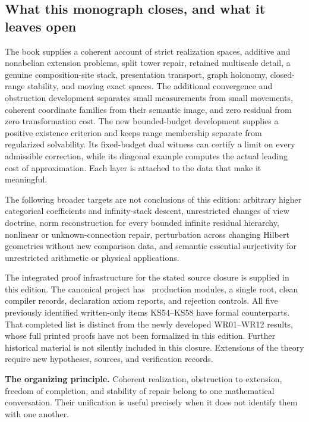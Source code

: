 \subsection{What this monograph closes, and what it leaves open}
The book supplies a coherent account of strict realization spaces, additive and nonabelian extension problems, split tower repair, retained multiscale detail, a genuine composition-site stack, presentation transport, graph holonomy, closed-range stability, and moving exact spaces. The additional convergence and obstruction development separates small measurements from small movements, coherent coordinate families from their semantic image, and zero residual from zero transformation cost. The new bounded-budget development supplies a positive existence criterion and keeps range membership separate from regularized solvability. Its fixed-budget dual witness can certify a limit on every admissible correction, while its diagonal example computes the actual leading cost of approximation. Each layer is attached to the data that make it meaningful.

The following broader targets are not conclusions of this edition: arbitrary higher categorical coefficients and infinity-stack descent, unrestricted changes of view doctrine, norm reconstruction for every bounded infinite residual hierarchy, nonlinear or unknown-connection repair, perturbation across changing Hilbert geometries without new comparison data, and semantic essential surjectivity for unrestricted arithmetic or physical applications.

The integrated proof infrastructure for the stated source closure is supplied in this edition. The canonical project has \EditionFormalModules\ production modules, a single root, clean compiler records, declaration axiom reports, and rejection controls. All five previously identified written-only items KS54--KS58 have formal counterparts. That completed list is distinct from the newly developed WR01--WR12 results, whose full printed proofs have not been formalized in this edition. Further historical material is not silently included in this closure. Extensions of the theory require new hypotheses, sources, and verification records.

\begin{insight}
\textbf{The organizing principle.} Coherent realization, obstruction to extension, freedom of completion, and stability of repair belong to one mathematical conversation. Their unification is useful precisely when it does not identify them with one another.
\end{insight}
